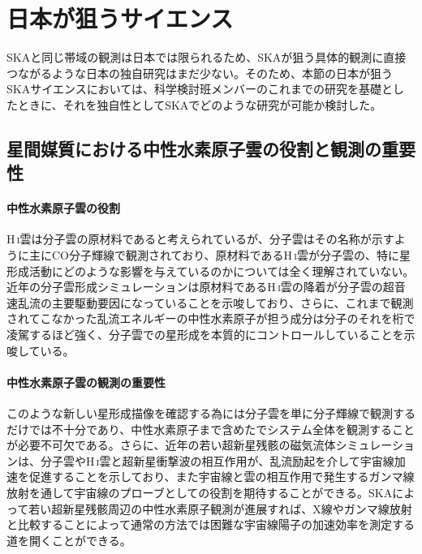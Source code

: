\setcounter{section}{2}\section{日本が狙うサイエンス}\label{c08.s3}

SKAと同じ帯域の観測は日本では限られるため、SKAが狙う具体的観測に直接つながるような日本の独自研究はまだ少ない。そのため、本節の日本が狙うSKAサイエンスにおいては、科学検討班メンバーのこれまでの研究を基礎としたときに、それを独自性としてSKAでどのような研究が可能か検討した。


\subsection{星間媒質における中性水素原子雲の役割と観測の重要性}
\label{c08.s4.ss1}

\paragraph{中性水素原子雲の役割}

H\,\textsc{i}雲は分子雲の原材料であると考えられているが、分子雲はその名称が示すように主にCO分子輝線で観測されており、原材料であるH\,\textsc{i}雲が分子雲の、特に星形成活動にどのような影響を与えているのかについては全く理解されていない。近年の分子雲形成シミュレーションは原材料であるH\,\textsc{i}雲の降着が分子雲の超音速乱流の主要駆動要因になっていることを示唆しており、さらに、これまで観測されてこなかった乱流エネルギーの中性水素原子が担う成分は分子のそれを桁で凌駕するほど強く、分子雲での星形成を本質的にコントロールしていることを示唆している\citep{2012ApJ...759...35I}。

\paragraph{中性水素原子雲の観測の重要性}

このような新しい星形成描像を確認する為には分子雲を単に分子輝線で観測するだけでは不十分であり、中性水素原子まで含めたでシステム全体を観測することが必要不可欠である。さらに、近年の若い超新星残骸の磁気流体シミュレーションは、分子雲やH\,\textsc{i}雲と超新星衝撃波の相互作用が、乱流励起を介して宇宙線加速を促進することを示しており、また宇宙線と雲の相互作用で発生するガンマ線放射を通して宇宙線のプローブとしての役割を期待することができる。SKAによって若い超新星残骸周辺の中性水素原子観測が進展すれば、X線やガンマ線放射と比較することによって通常の方法では困難な宇宙線陽子の加速効率を測定する道を開くことができる\citep{2012ApJ...744...71I}。

